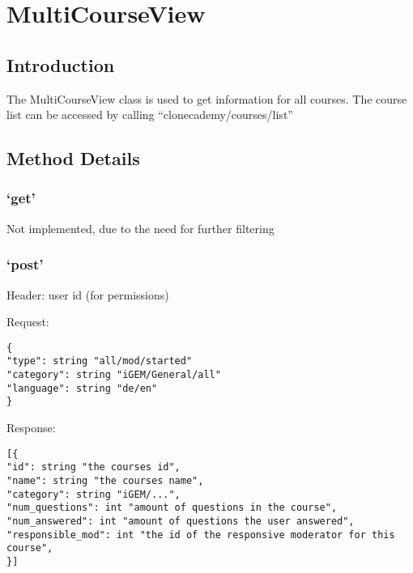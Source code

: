 \chapter*{MultiCourseView}

\section*{Introduction}\label{introduction}

The MultiCourseView class is used to get information for all courses. The
course list can be accessed by calling ``clonecademy/courses/list''

\section*{Method Details}\label{method-details}

\subsection*{\texorpdfstring{`get'}{get}}\label{get}

Not implemented, due to the need for further filtering

\subsection*{\texorpdfstring{`post'}{post}}\label{post}

Header: user id (for permissions)

Request:

\begin{verbatim}
{
"type": string "all/mod/started"
"category": string "iGEM/General/all"
"language": string "de/en"
}
\end{verbatim}

Response:

\begin{verbatim}
[{
"id": string "the courses id",
"name": string "the courses name",
"category": string "iGEM/...",
"num_questions": int "amount of questions in the course",
"num_answered": int "amount of questions the user answered",
"responsible_mod": int "the id of the responsive moderator for this course",
}]
\end{verbatim}
